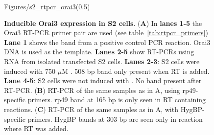 \begin{figure}[ht!]
\begin{center}\vspace{-125pt}
	\begin{lpic}[]{Figures/s2_rtpcr_orai3(0.5)}
		
	\end{lpic}\vspace{100pt}
	\caption[Inducible Orai3 expression \droso{} in S2 cells]{{\bfseries Inducible Orai3 expression \droso{} in S2 cells}.
	({\bfseries A}) In {\bfseries lanes 1-5} the Orai3 RT-PCR primer pair are used (see table~\ref{tab:rtpcr_primers})
	{\bfseries Lane 1} shows the band from a positive control PCR reaction. Orai3 DNA is used as the template.
	{\bfseries Lanes 2-5} show RT-PCRs using RNA from isolated \oraiiiivector{} transfected S2 cells.
	{\bfseries Lanes 2-3}: S2 cells were induced with 750 $\mu$M \cuso. 508 bp band only present when RT is added.
	{\bfseries Lane 4-5}: S2 cells were not induced with \cuso. No band present after RT-PCR.
	({\bfseries B}) RT-PCR of the same samples as in A, using rp49-specific primers. rp49 band at 165 bp is only seen in RT containing reactions.	
	({\bfseries C}) RT-PCR of the same samples as in A, with HygBP-specific primers.  HygBP bands at 303 bp are seen only in reaction where RT was added.
	\label{fig:orai3_rtpcr}}
\end{center}
\end{figure}
 

